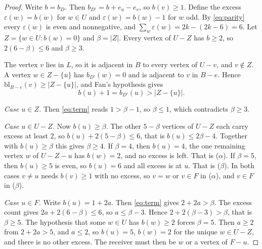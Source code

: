 \documentclass[11pt]{amsart}
\theoremstyle{definition}
\newcommand{\bl}{\mathrm{bl}}
\begin{document}
\begin{proof}
Write $b=b_D$. Then $b_{D'}=b+e_u-e_v$, so $b(v)\ge1$. Define the excess $\varepsilon(w)=b(w)$ for
$w\in U$ and $\varepsilon(w)=b(w)-1$ for $w$ odd. By \eqref{eq:parity} every $\varepsilon(w)$ is
even and nonnegative, and $\sum_w\varepsilon(w)=2k-(2k-6)=6$. Let $Z=\{w\in U:b(w)=0\}$ and
$\beta=|Z|$. Every vertex of $U-Z$ has $b\ge2$, so $2(6-\beta)\le 6$ and $\beta\ge3$.

The vertex $v$ lies in $L$, so it is adjacent in $B$ to every vertex of $U-v$, and $v\notin Z$. A
vertex $w\in Z-\{u\}$ has $b_{D'}(w)=0$ and is adjacent to $v$ in $B-e$. Hence
$\bl_{B-e}(v)\ge|Z-\{u\}|$, and Fan's hypothesis gives
\begin{equation}\label{eq:term}
b(u)+1=b_{D'}(u)>|Z-\{u\}|.
\end{equation}

\emph{Case $u\in Z$.} Then \eqref{eq:term} reads $1>\beta-1$, so $\beta\le1$, which contradicts
$\beta\ge3$.

\emph{Case $u\in U-Z$.} Now $b(u)\ge\beta$. The other $5-\beta$ vertices of $U-Z$ each carry excess
at least $2$, so $b(u)+2(5-\beta)\le6$, that is $b(u)\le2\beta-4$. Together with $b(u)\ge\beta$
this gives $\beta\ge4$. If $\beta=4$, then $b(u)=4$, the one remaining vertex $w$ of $U-Z-u$ has
$b(w)=2$, and no excess is left. That is ($\alpha$). If $\beta=5$, then $b(u)\ge5$ is even, so
$b(u)=6$ and all excess is at $u$. That is ($\beta$). In both cases $v\ne u$ needs $b(v)\ge1$ with
no excess, so $v=w$ or $v\in F$ in ($\alpha$), and $v\in F$ in ($\beta$).

\emph{Case $u\in F$.} Write $b(u)=1+2a$. Then \eqref{eq:term} gives $2+2a>\beta$. The excess count
gives $2a+2(6-\beta)\le6$, so $a\le\beta-3$. Hence $2+2(\beta-3)>\beta$, that is $\beta\ge5$. The
hypothesis that some $w\in U$ has $b(w)\ge2$ forces $\beta=5$. Then $a\ge2$ from $2+2a>5$, and
$a\le2$, so $b(u)=5$, $b(w)=2$ for the unique $w\in U-Z$, and there is no other excess. The receiver
must then be $w$ or a vertex of $F-u$.
\end{proof}
\end{document}
